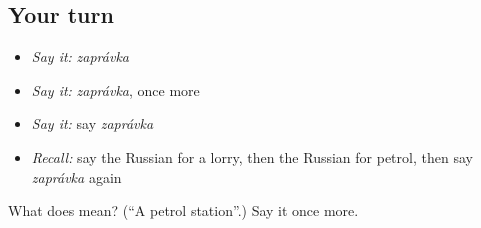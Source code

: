 \subsection*{Your turn}
\begin{itemize}
\raggedright
  \item \emph{Say it:} \emph{zaprávka}
  \item \emph{Say it:} \emph{zaprávka}, once more
  \item \emph{Say it:} say \emph{zaprávka}
  \item \emph{Recall:} say the Russian for a lorry, then the Russian for petrol, then say \emph{zaprávka} again
\end{itemize}

\begin{tcolorbox}[breakable,colback=teal!4,colframe=teal!35!black,title={Before you move on}]
What does  mean? (\textquotedblleft{}A petrol station\textquotedblright{}.) Say it once more.
\end{tcolorbox}
